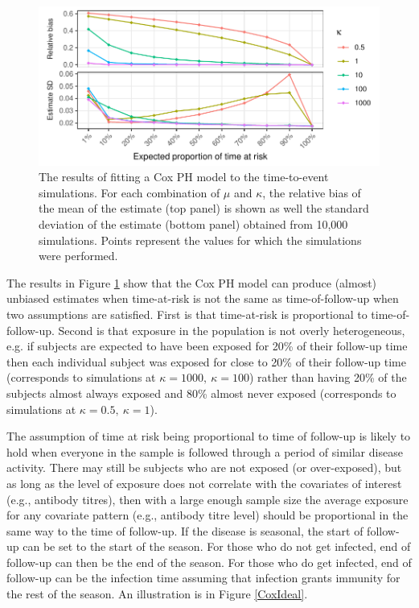 \begin{figure}[htp]
	\centering
	\includegraphics[width=1\textwidth]{../cox-tarprop-plot/risk.pdf}
	\caption{
	The results of fitting a Cox PH model to the time-to-event simulations. For each combination of $\mu$ and $\kappa$, the relative bias of the mean of the estimate (top panel) is shown as well the standard deviation of the estimate (bottom panel) obtained from 10,000 simulations. Points represent the values for which the simulations were performed.
	}
	\label{CoxSimResults}
\end{figure}

The results in Figure \ref{CoxSimResults} show that the Cox PH model can produce (almost) unbiased estimates when time-at-risk is not the same as time-of-follow-up when two assumptions are satisfied. First is that time-at-risk is proportional to time-of-follow-up. Second is that exposure in the population is not overly heterogeneous, e.g. if subjects are expected to have been exposed for 20\% of their follow-up time then each individual subject was exposed for close to 20\% of their follow-up time (corresponds to simulations at $\kappa = 1000,\ \kappa = 100$) rather than having 20\% of the subjects almost always exposed and 80\% almost never exposed (corresponds to simulations at $\kappa = 0.5,\ \kappa = 1$).

The assumption of time at risk being proportional to time of follow-up is likely to hold when everyone in the sample is followed through a period of similar disease activity. There may still be subjects who are not exposed (or over-exposed), but as long as the level of exposure does not correlate with the covariates of interest (e.g., antibody titres), then with a large enough sample size the average exposure for any covariate pattern (e.g., antibody titre level) should be proportional in the same way to the time of follow-up. If the disease is seasonal, the start of follow-up can be set to the start of the season. For those who do not get infected, end of follow-up can then be the end of the season. For those who do get infected, end of follow-up can be the infection time assuming that infection grants immunity for the rest of the season. An illustration is in Figure \ref{CoxIdeal}.

